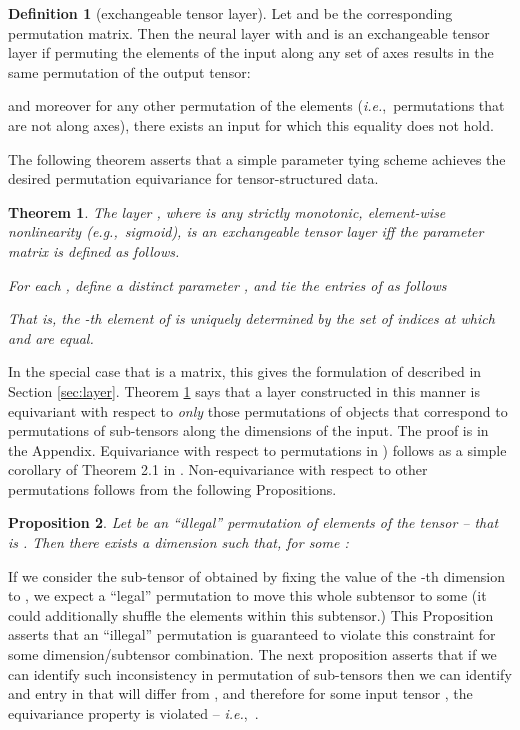 \documentclass{article}
\newcommand{\ie}[0]{\emph{i.e.},~}
\newcommand{\eg}[0]{\emph{e.g.},~}
\newtheorem{theorem}{Theorem}[section]
\newtheorem{proposition}[theorem]{Proposition}
\theoremstyle{definition}
\newtheorem{definition}{Definition}[section]
\begin{document}
\begin{definition}[exchangeable tensor layer]
Let 
and  be the corresponding permutation matrix. 
Then the neural layer  with  
and  is an exchangeable tensor layer if permuting the elements of the input along any set of axes results in the same permutation of the output tensor:

and moreover for any other permutation of the elements  (\ie permutations that are not along axes), 
there exists an input  for which this equality does not hold. 
\end{definition}


The following theorem asserts that a simple parameter tying scheme achieves the desired permutation equivariance for tensor-structured data. 

\begin{theorem}\label{thm:equivar}
The layer , where  is any strictly monotonic, element-wise nonlinearity (\eg sigmoid), is an exchangeable tensor layer iff the parameter matrix  is defined as follows. 

For each , define a distinct parameter , and tie the 
entries of  as follows 

That is, the -th element of  is uniquely determined by the set of indices at which  and  are equal. \end{theorem}

In the special case that  is a matrix, this gives the formulation of  described in Section \ref{sec:layer}. 
Theorem \ref{thm:equivar} says that a layer constructed in this manner is equivariant with respect to \textit{only} those permutations of  objects that correspond to permutations of  sub-tensors along the  dimensions of the input. The proof is in the Appendix. Equivariance with respect to permutations in ) follows as a simple corollary of Theorem 2.1 in \cite{ravanbakhsh_symmetry}. Non-equivariance with respect to other permutations follows from the following Propositions. \begin{proposition}\label{prop:equivar1}
Let  be an ``illegal'' permutation of elements of the tensor  -- that is . Then there exists a dimension  such that, for some :
    
\end{proposition}

If we consider the sub-tensor of  obtained by fixing the value of the -th dimension to , we expect a ``legal'' permutation to move this whole subtensor to some  (it could additionally shuffle the elements within this subtensor.) This Proposition asserts that an ``illegal'' permutation  is guaranteed to violate this constraint for some dimension/subtensor combination. 
The next proposition asserts that if we can identify such inconsistency in permutation of sub-tensors then we can
identify and entry in  that will differ from  , and therefore
for some input tensor , the equivariance property is violated -- \ie .
\end{document}
